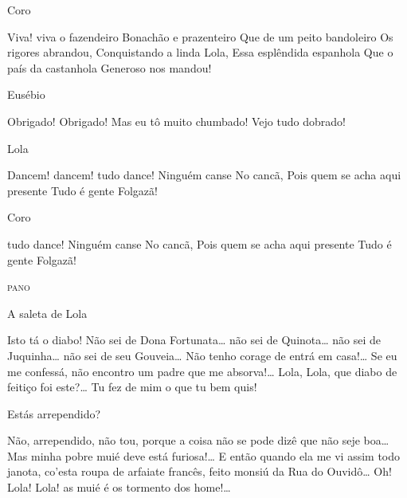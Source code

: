 
 Coro

 Viva! viva o fazendeiro
 Bonachão e prazenteiro
 Que de um peito bandoleiro
 Os rigores abrandou,
 Conquistando a linda Lola,
 Essa esplêndida espanhola
 Que o país da castanhola
 Generoso nos mandou!

\repl{} 

 Eusébio

 Obrigado!
 Obrigado!
 Mas eu tô muito chumbado!
 Vejo tudo dobrado!

 Lola

 Dancem! dancem! tudo dance!
 Ninguém canse
 No cancã,
 Pois quem se acha aqui presente
 Tudo é gente
 Folgazã!

 Coro

 tudo dance!
 Ninguém canse
 No cancã,
 Pois quem se acha aqui presente
 Tudo é gente
 Folgazã!


\begin{center}
\textsc{pano}
\end{center}

\newact


A saleta de Lola



 Isto tá o diabo! Não sei de Dona Fortunata\ldots{} não sei de
Quinota\ldots{} não sei de Juquinha\ldots{} não sei de seu Gouveia\ldots{} Não tenho corage de entrá em
casa!\ldots{} Se eu me confessá, não encontro um padre que me absorva!\ldots{} Lola, Lola,
que diabo de feitiço foi este?\ldots{} Tu fez de mim o que tu bem quis!

 Estás arrependido?

 Não, arrependido, não tou, porque a coisa não se pode dizê que
não seje boa\ldots{} Mas minha pobre muié deve está furiosa!\ldots{} E então quando ela
me vi assim todo janota, co’esta roupa de arfaiate francês, feito monsiú da Rua
do Ouvidô\ldots{} Oh! Lola! Lola! as muié é os tormento dos home!\ldots{} 


